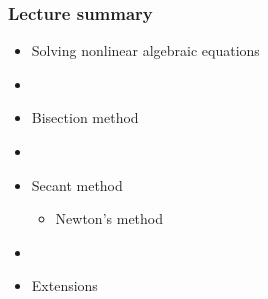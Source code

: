 \documentclass[english,14pt]{beamer}
\begin{document}
%
%
%
%


\begin{frame}[fragile]

\frametitle{Lecture summary}
\begin{itemize}
	\item Solving nonlinear algebraic equations

	\item[]
	
	\item Bisection method

	\item[]
	
	\item Secant method
	\begin{itemize}
		\item Newton's method
	\end{itemize}

	\item[]
	
	\item Extensions
	
\end{itemize}

\end{frame}

\end{document}
